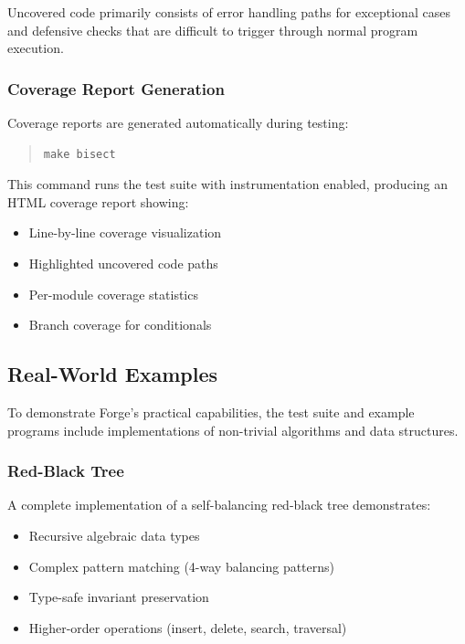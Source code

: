 \documentclass[conference,onecolumn]{IEEEtran}
\begin{document}
Uncovered code primarily consists of error handling paths for exceptional cases and defensive checks that are difficult to trigger through normal program execution.

\subsubsection{Coverage Report Generation}

Coverage reports are generated automatically during testing:

\begin{quote}
\small
\begin{verbatim}
make bisect
\end{verbatim}
\end{quote}

This command runs the test suite with instrumentation enabled, producing an HTML coverage report showing:
\begin{itemize}
\item Line-by-line coverage visualization
\item Highlighted uncovered code paths
\item Per-module coverage statistics
\item Branch coverage for conditionals
\end{itemize}

\subsection{Real-World Examples}

To demonstrate Forge's practical capabilities, the test suite and example programs include implementations of non-trivial algorithms and data structures.

\subsubsection{Red-Black Tree}

A complete implementation of a self-balancing red-black tree demonstrates:

\begin{itemize}
\item Recursive algebraic data types
\item Complex pattern matching (4-way balancing patterns)
\item Type-safe invariant preservation
\item Higher-order operations (insert, delete, search, traversal)
\end{itemize}
\end{document}
